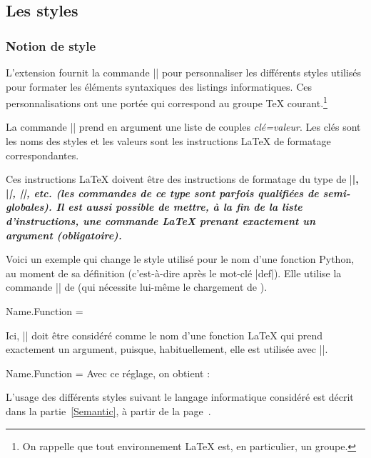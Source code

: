 \documentclass[dvipsnames,svgnames]{article}
\begin{document}
\subsection{Les styles}

\label{styles}

\subsubsection{Notion de style}

L'extension  fournit la commande |\SetPitonStyle| pour personnaliser les
différents styles utilisés pour formater les éléments syntaxiques des listings
informatiques. Ces personnalisations ont une portée qui correspond au groupe TeX
courant.\footnote{On rappelle que tout environnement LaTeX est, en particulier, un
  groupe.}

\bigskip
{} La commande |\SetPitonStyle| prend en argument une liste de
couples \textsl{clé=valeur}. Les clés sont les noms des styles et les valeurs sont les
instructions LaTeX de formatage correspondantes.

\bigskip
Ces instructions LaTeX doivent être des instructions de formatage du type de |\bfseries|,
|\slshape|, |\color{...}|, etc. (les commandes de ce type sont parfois
qualifiées de \emph{semi-globales}). Il est aussi possible de mettre, \emph{à la fin de la liste
  d'instructions}, une commande LaTeX prenant exactement un argument (obligatoire).

\bigskip
Voici un exemple qui change le style utilisé pour le nom d'une fonction Python, au moment
de sa définition (c'est-à-dire après le mot-clé |def|). Elle utilise la commande
|\highLight| de  (qui nécessite lui-même le chargement de ).

\medskip
\begin{Code}
\SetPitonStyle
  { Name.Function = \bfseries \highLight[red!30] }
\end{Code}

Ici, |\highLight[red!30]| doit être considéré comme le nom d'une fonction LaTeX qui prend
exactement un argument, puisque, habituellement, elle est utilisée avec
||.

\medskip
\begingroup
\SetPitonStyle 
  { Name.Function = \bfseries \highLight[red!30] }
Avec ce réglage, on obtient : 
\endgroup

\bigskip
L'usage des différents styles suivant le langage informatique considéré est décrit dans la
partie~\ref{Semantic}, à partir de la page~\pageref{Semantic}.
\end{document}
